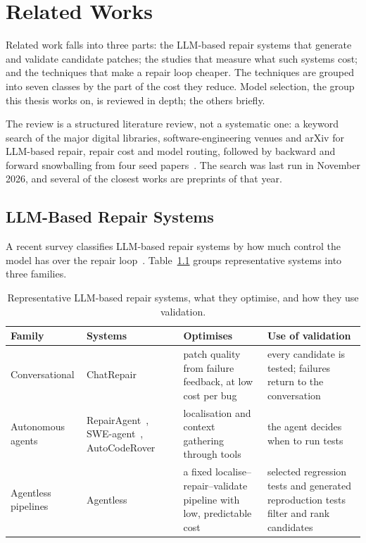 \chapter{Related Works}
\label{ch:related}

Related work falls into three parts: the LLM-based repair systems that
generate and validate candidate patches; the studies that measure what such
systems cost; and the techniques that make a repair loop cheaper. The
techniques are grouped into seven classes by the part of the cost they reduce.
Model selection, the group this thesis works on, is reviewed in depth; the
others briefly.

The review is a structured literature review, not a systematic one: a keyword
search of the major digital libraries, software-engineering venues and arXiv
for LLM-based repair, repair cost and model routing, followed by backward and
forward snowballing from four seed
papers~\citep{xia2024chatrepair,lin2026torun,chen2023frugalgpt,son2026swerouter}.
The search was last run in November 2026, and several of the closest works are
preprints of that year.

\section{LLM-Based Repair Systems}
\label{sec:rel-systems}

A recent survey classifies LLM-based repair systems by how much control the
model has over the repair loop~\citep{yang2025llmrepairsurvey}.
Table~\ref{tab:rel-systems} groups representative systems into three families.

\begin{table}[htbp]
\centering
\caption{Representative LLM-based repair systems, what they optimise, and how
they use validation.}
\label{tab:rel-systems}
\footnotesize
\begin{tabularx}{\textwidth}{@{}>{\raggedright\arraybackslash}p{} >{\raggedright\arraybackslash}p{} >{\raggedright\arraybackslash}X >{\raggedright\arraybackslash}X@{}}
\toprule
Family & Systems & Optimises & Use of validation\\
\midrule
Conversational & ChatRepair~\citep{xia2024chatrepair} &
patch quality from failure feedback, at low cost per bug &
every candidate is tested; failures return to the conversation\\
Autonomous agents & RepairAgent~\citep{bouzenia2025repairagent},
SWE-agent~\citep{yang2024sweagent}, AutoCodeRover~\citep{zhang2024autocoderover} &
localisation and context gathering through tools &
the agent decides when to run tests\\
Agentless pipelines & Agentless~\citep{xia2025agentless} &
a fixed localise--repair--validate pipeline with low, predictable cost &
selected regression tests and generated reproduction tests filter and rank
candidates\\
\bottomrule
\end{tabularx}
\end{table}

